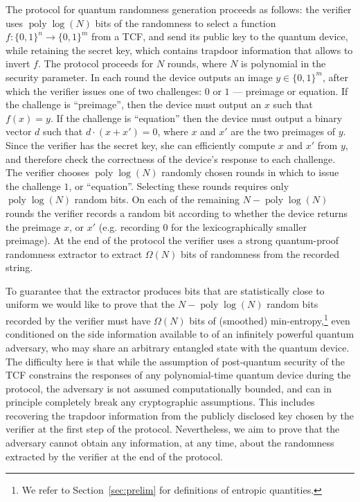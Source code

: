 \documentclass[11pt]{article}
\theoremstyle{remark}
\theoremstyle{definition}
\DeclareMathOperator{\poly}{poly}
\begin{document}
The protocol for quantum randomness generation proceeds as follows: the verifier uses $\poly\log(N)$ bits of the randomness to 
select a function $f:\{0,1\}^n \rightarrow \{0,1\}^m$ from a TCF, and send its public key to the quantum device, while retaining the secret key, which contains trapdoor information that allows to invert $f$.
The protocol proceeds for $N$ rounds, where $N$ is polynomial in the security parameter. In each round the device outputs an image $y \in \{0,1\}^m$, after which the verifier issues one of two 
challenges: $0$ or $1$ --- preimage or equation. If the challenge is ``preimage'', then the device must output an $x$ such that $f(x) = y$. If the challenge is 
``equation'' then the device must output a binary vector $d$ such that $d\cdot(x + x') = 0$, where $x$ and $x'$ are the two preimages of $y$. Since the verifier has the secret key, she can efficiently compute $x$ and $x'$ from $y$, and therefore check the correctness of the
device's response to each challenge. The verifier chooses 
$\poly\log(N)$ randomly chosen rounds in which to issue the challenge $1$, or ``equation''. Selecting these rounds requires only
$\poly\log(N)$ random bits. On each of the remaining $N - \poly\log(N)$ rounds the verifier records a random bit according to 
whether the device returns the preimage $x$, or $x'$ (e.g. recording $0$ for the lexicographically smaller preimage). At the end of the protocol the verifier
uses a strong quantum-proof randomness extractor to extract $\Omega(N)$ bits of randomness from the recorded string. 

To guarantee that the extractor produces bits that are statistically close to uniform we would like to prove that the $N - \poly\log(N)$ random bits recorded by the verifier must have  $\Omega(N)$ bits of (smoothed) min-entropy,\footnote{We refer to Section~\ref{sec:prelim} for definitions of entropic quantities.} even conditioned on the side information available to of an infinitely powerful quantum adversary, who may share an arbitrary entangled state with
the quantum device. The difficulty here is that while the assumption of  post-quantum security of the TCF constrains the responses of any polynomial-time quantum device during the
protocol, the adversary is not assumed computationally bounded, and can in principle completely break any cryptographic assumptions. This includes recovering the trapdoor information from the publicly disclosed key chosen by the verifier at the first step of the protocol. Nevertheless, we aim to prove that the adversary cannot obtain any information, at any time, about the randomness extracted by the verifier at the end of the protocol. 
\end{document}
